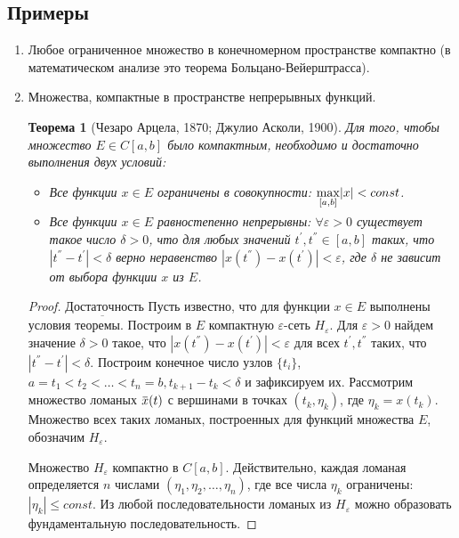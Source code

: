 \documentclass[12pt,a4paper,titlepage,oneside]{book}
\newcommand{\overbar}[1]{\mkern 1.5mu\overline{\mkern-1.5mu#1\mkern-1.5mu}\mkern 1.5mu}
\theoremstyle{definition}
\theoremstyle{plain}
\newtheorem*{theorem}{Теорема}
\theoremstyle{break}
\theoremstyle{remark}
\theoremstyle{remark}
\theoremstyle{remark}
\theoremstyle{remark}
\theoremstyle{plain}
\theoremstyle{plain}
\begin{document}
\subsection*{Примеры}
\begin{enumerate}

	\item Любое ограниченное множество в конечномерном пространстве компактно (в математическом анализе это теорема Больцано-Вейерштрасса).

	\item Множества, компактные в пространстве непрерывных функций.

\begin{theorem} [Чезаро Арцела, 1870; Джулио Асколи, 1900]
Для того, чтобы множество $E \in C[a, b]$ было компактным, необходимо и достаточно выполнения двух условий:

\begin{itemize}

	\item  Все функции $x\in E$ ограничены в совокупности: $\smash{\displaystyle\max_{ [a,b]}} |x| < const$.

	\item  Все функции $x\in E$ равностепенно непрерывны: $\forall \varepsilon>0$ существует такое число $\delta>0$, что для любых значений $t^{'}, t^{''} \in [a, b]$ таких, что $|t^{''}-t^{'}| <\delta$ верно неравенство $|x(t^{''})-x(t^{'})| <\varepsilon$, где $\delta$ не зависит от выбора функции $x$ из $E$.
	
\end{itemize}

\end{theorem}
\begin{proof} 
	$\underbar{Достаточность}$ Пусть известно, что для функции $x\in E$ выполнены условия теоремы. Построим в $E$ компактную 	$\varepsilon$-сеть $H_{\varepsilon}$. Для 	$ \varepsilon>0$ найдем значение $\delta>0$ такое, что $|x(t^{''})-x(t^{'})| <\varepsilon$ для всех $t^{'}, t^{''}$ таких, что $|t^{''}-t^{'}| <\delta$. Построим конечное число узлов $\{t_i\}$, $a=t_1<t_2<\ldots<t_n=b, t_{k+1}-t_k< \delta$ и зафиксируем их. Рассмотрим множество ломаных $\overbar{x}(t)$ с вершинами в точках $(t_k, \eta_k )$, где $\eta_k=x(t_k)$. Множество всех таких ломаных, построенных для функций множества $E$, обозначим $H_{\varepsilon}$.
	
	Множество $H_{\varepsilon}$ компактно в $C[a, b]$. Действительно, каждая ломаная определяется $n$ числами $(\eta_1, \eta_2,\ldots,\eta_n )$, где все числа $\eta_k$ ограничены: $|\eta_k|\leqslant const$. Из любой последовательности ломаных из $H_{\varepsilon}$ можно образовать фундаментальную последовательность.
	

\end{proof}
\end{enumerate}
\end{document}
